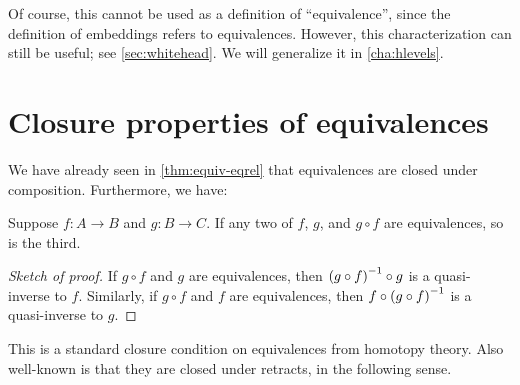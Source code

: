 Of course, this cannot be used as a definition of ``equivalence'', since the definition of embeddings refers to equivalences.
However, this characterization can still be useful; see \autoref{sec:whitehead}.
We will generalize it in \autoref{cha:hlevels}.


\section{Closure properties of equivalences}
\label{sec:equiv-closures}
\label{sec:fiberwise-equivalences}

We have already seen in \autoref{thm:equiv-eqrel} that equivalences are closed under composition.
Furthermore, we have:

\begin{thm}\label{thm:two-out-of-three}
  Suppose $f:A\to B$ and $g:B\to C$.
  If any two of $f$, $g$, and $g\circ f$ are equivalences, so is the third.
\end{thm}
\begin{proof}[Sketch of proof]
  If $g\circ f$ and $g$ are equivalences, then $\mathord{{(g\circ f)}^{-1}} \circ g$ is a quasi-inverse to $f$.
  Similarly, if $g\circ f$ and $f$ are equivalences, then $f\circ \mathord{{(g\circ f)}^{-1}}$ is a quasi-inverse to $g$.
\end{proof}

This is a standard closure condition on equivalences from homotopy theory.
Also well-known is that they are closed under retracts, in the following sense.

